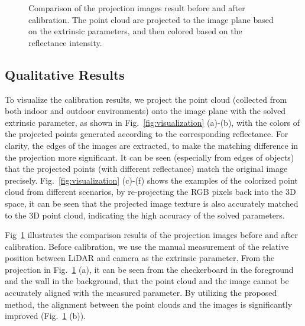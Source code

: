 \documentclass[journal]{vgtc}
\begin{document}
\begin{figure}[!htb]
	\centering
	\vspace{.1in}
	\caption{Comparison of the projection images result before and after calibration. The point cloud are projected to the image plane based on the extrinsic parameters, and then colored based on the reflectance intensity.}
	\label{fig:calibration_result} 
\end{figure}

\subsection{Qualitative Results}

To visualize the calibration results, we project the point cloud (collected from both indoor and outdoor environments) onto the image plane with the solved extrinsic parameter, as shown in Fig.~\ref{fig:visualization} (a)-(b), with the colors of the projected points generated according to the corresponding reflectance. For clarity, the edges of the images are extracted, to make the matching difference in the projection more significant. It can be seen (especially from edges of objects) that the projected points (with different reflectance) match the original image precisely. Fig.~\ref{fig:visualization} (c)-(f) shows the examples of the colorized point cloud from different scenarios, by re-projecting the RGB pixels back into the 3D space, it can be seen that the projected image texture is also accurately matched to the 3D point cloud, indicating the high accuracy of the solved parameters.

Fig~\ref{fig:calibration_result} illustrates the comparison results of the projection images before and after calibration. Before calibration, we use the manual measurement of the relative position between LiDAR and camera as the extrinsic parameter. From the projection in Fig.~\ref{fig:calibration_result} (a), it can be seen from the checkerboard in the foreground and the wall in the background, that the point cloud and the image cannot be accurately aligned with the measured parameter. By utilizing the proposed method, the alignment between the point clouds and the images is significantly improved (Fig.~\ref{fig:calibration_result} (b)).
\end{document}
